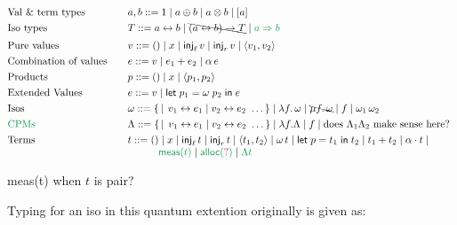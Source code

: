 \documentclass[12pt]{article}
\newcommand{\gr}[1]{\textcolor{ForestGreen}{#1}}
\newcommand{\rd}[1]{\textcolor{Maroon}{#1}}
\newcommand{\kw}[1]{\mathsf{#1}}
\begin{document}
\[
  \begin{array}{@{}l@{\qquad}l@{}}
    \text{Val \& term types} &
                               a,b ::= 1 \mid a \oplus b \mid a \otimes b \mid [a] \\[0.8ex]
    \text{Iso types} &
                       T ::= a \leftrightarrow b \mid \bcancel{(a \leftrightarrow b) \to T} \mid \gr{a \Rightarrow b} \\[1.2ex]
    \text{Pure values} &
                         v ::= () \mid x \mid \kw{inj}_{\ell}\, v \mid \kw{inj}_{r}\, v \mid \langle v_1, v_2\rangle \\[0.8ex]
    \text{Combination of values} &
                                   e ::= v \mid e_1 + e_2 \mid \alpha\, e \\[0.8ex]
    \text{Products} &
                      p ::= () \mid x \mid \langle p_1, p_2\rangle \\[0.8ex]
    \text{Extended Values} &
                             e ::= v \mid \kw{let}\; p_1 = \omega\; p_2\; \kw{in}\; e \\[0.8ex]
    \text{Isos} &
                  \omega ::= \{\, \mid\, v_1 \leftrightarrow e_1 \mid v_2 \leftrightarrow e_2 \ \ldots \,\}
                  \mid \lambda f.\,\omega \mid \bcancel{\mu f.\,\omega} \mid f \mid \omega_1\,\omega_2 \\[0.8ex]
    \gr{\text{CPMs}} &
                       \Lambda ::= \{\, \mid\, v_1 \leftrightarrow e_1 \mid v_2 \leftrightarrow e_2 \ \ldots \,\}
                       \mid \lambda f. \Lambda \mid f \mid \text{does } \Lambda_{1}\Lambda_{2} \text{ make sense here? }\\[0.8ex]
    \text{Terms} &
                   t ::= () \mid x \mid \kw{inj}_{\ell}\, t \mid \kw{inj}_{r}\, t \mid \langle t_1, t_2\rangle \mid
                   \omega\, t \mid \kw{let}\; p = t_1\; \kw{in}\; t_2 \mid t_1 + t_2 \mid \alpha \cdot t \mid \\  & \ \ \ \ \ \ \ \ \ \gr{\kw{meas}(t)} \mid \gr{\kw{alloc}(\rd{?})} \mid \gr{\Lambda t}
  \end{array}
\]

\textsf{meas(t)} when $t$ is pair?



Typing for an iso in this quantum extention originally is given as:
\end{document}
